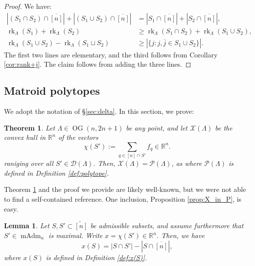 \documentclass[12pt]{amsart}
\newtheorem{theorem}[definition]{Theorem}
\newtheorem{lemma}[definition]{Lemma}
\DeclareMathOperator{\OG}{OG}
\DeclareMathOperator{\rk}{rk}
\DeclareMathOperator{\mAdm}{mAdm}
\newcommand{\cD}{\mathcal{D}}
\newcommand{\cP}{\mathcal{P}}
\newcommand{\bR}{\mathbb{R}}
\newcommand{\cX}{\mathcal{X}}
\newcommand{\wtn}{\widetilde{[n]}}
\newcommand{\barj}{\overline{j}}
\begin{document}
\begin{proof}
    We have:
    \begin{align*}
        |(S_1\cap S_2)\cap \overline{[n]}|+|(S_1\cup S_2)\cap \overline{[n]}|&=|S_1\cap\overline{[n]}|+|S_2\cap \overline{[n]}|,\\
        \rk_\Lambda(S_1)+\rk_\Lambda(S_2)&\ge \rk_\Lambda(S_1\cap S_2)+\rk_\Lambda(S_1 \cup S_2),\\
        \rk_\Lambda(S_1\cup S_2)-\rk_\Lambda(S_1\sqcup S_2)&\ge |\{j:j,\barj\in S_1\cup S_2\}|.
    \end{align*}
    The first two lines are elementary, and the third follows from Corollary \ref{cor:rank+j}. The claim follows from adding the three lines.
\end{proof}



\subsection{Matroid polytopes}\label{sec:polytopes}

We adopt the notation of \S\ref{sec:delta}. In this section, we prove:

\begin{theorem}\label{thm:polytopes_same}
Let $\Lambda\in\OG(n,2n+1)$ be any point, and let $\cX(\Lambda)$ be the convex hull in $\mathbb{R}^n$ of the vectors
\begin{equation*}
    \chi(S'):=\sum_{q\in [n]\cap S'}f_q\in\mathbb{R}^n.
\end{equation*}
raniging over all $S'\in\cD(\Lambda)$. Then, $\cX(\Lambda)=\cP(\Lambda)$, as where $\cP(\Lambda)$ is defined in Definition \ref{def:polytope}.
\end{theorem}

Theorem \ref{thm:polytopes_same} and the proof we provide are likely well-known, but we were not able to find a self-contained reference. One inclusion, Proposition \ref{prop:X_in_P}, is easy.

\begin{lemma}\label{lem:chi(S')(S)_formula}
    Let $S,S'\subset \wtn$ be admissible subsets, and assume furthermore that $S'\in\mAdm_n$ is maximal. Write $x=\chi(S')\in\bR^n$. Then, we have
    \begin{equation*}
        x(S)=|S\cap S'|-|S\cap \overline{[n]}|,
    \end{equation*}
    where $x(S)$ is defined in Definition \ref{def:x(S)}.
\end{lemma}
\end{document}
